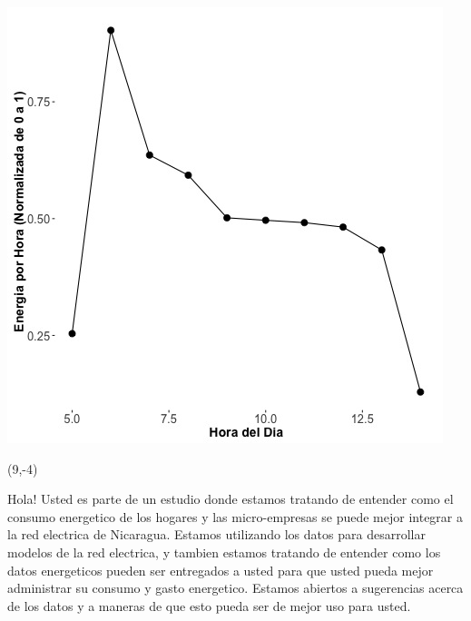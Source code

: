 \documentclass{article}\usepackage[]{graphicx}\usepackage[]{color}
\newenvironment{knitrout}{}{} %
\begin{document}
\begin{knitrout}
\color{fgcolor}
\includegraphics[scale=0.75]{figure/A19_fplot_norm_median} 
\end{knitrout}

 \begin{textblock}{1}(9,-4)
\begin{minipage}{20em}
\begingroup

\endgroup
\end{minipage}
\end{textblock}

\vspace{70px}
\begin{knitrout}
Hola! Usted es parte de un estudio donde estamos tratando de entender como el consumo energetico de los hogares y las micro-empresas se puede mejor integrar a la red electrica de Nicaragua. Estamos utilizando los datos para desarrollar modelos de la red electrica, y tambien estamos tratando de entender como los datos energeticos pueden ser entregados a usted para que usted pueda mejor administrar su consumo y gasto energetico.  Estamos abiertos a sugerencias acerca de los datos y a maneras de que esto pueda ser de mejor uso para usted.
\end{knitrout}
\end{document}
